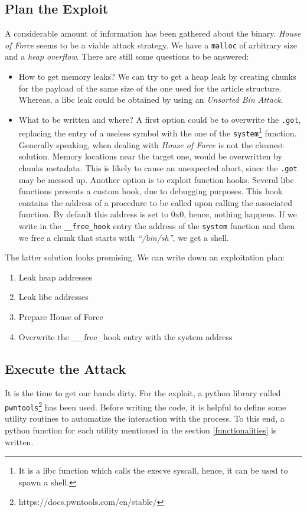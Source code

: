 \documentclass{article}
\numberwithin{equation}{subsection}
\begin{document}
\subsection{Plan the Exploit}
A considerable amount of information has been gathered about the binary. \emph{House of Force} seems to be a viable attack strategy. We have a \texttt{malloc} of arbitrary size and a \emph{heap overflow}. There are still some questions to be answered:
\begin{itemize}
    \item How to get memory leaks? We can try to get a heap leak by creating chunks for the payload of the same size of the one used for the article structure. Whereas, a libc leak could be obtained by using an \emph{Unsorted Bin Attack}.
    \item What to be written and where? A first option could be to overwrite the \texttt{.got}, replacing the entry of a useless symbol with the one of the \texttt{system}\footnote{It is a libc function which calls the execve syscall, hence, it can be used to spawn a shell.} function. Generally speaking, when dealing with \emph{House of Force} is not the cleanest solution. Memory locations near the target one, would be overwritten by chunks metadata. This is likely to cause an unexpected abort, since the \texttt{.got} may be messed up. Another option is to exploit function hooks. Several libc functions presents a custom hook, due to debugging purposes. This hook contains the address of a procedure to be called upon calling the associated function. By default this address is set to 0x0, hence, nothing happens. If we write in the \texttt{\_\_free\_hook} entry the address of the \texttt{system} function and then we free a chunk that starts with \textit{``/bin/sh''}, we get a shell. 
\end{itemize}
The latter solution looks promising. We can write down an exploitation plan:
\begin{enumerate}
    \item Leak heap addresses
    \item Leak libc addresses
    \item Prepare House of Force
    \item Overwrite the \_\_free\_hook entry with the system address
\end{enumerate}
\subsection{Execute the Attack}
It is the time to get our hands dirty. For the exploit, a python library called \texttt{pwntools}\footnote{https://docs.pwntools.com/en/stable/} has been used. Before writing the code, it is helpful to define some utility routines to automatize the interaction with the process. To this end, a python function for each utility mentioned in the section \ref{functionalities} is written.
\end{document}
